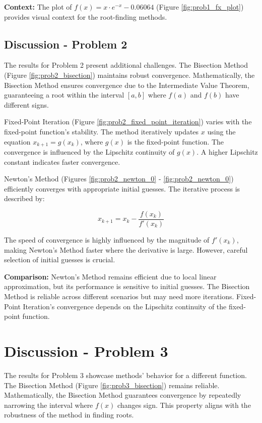 \documentclass[12pt, letterpaper]{article}
\begin{document}
\textbf{Context:} The plot of \(f(x) = x \cdot e^{-x} - 0.06064\) (Figure \ref{fig:prob1_fx_plot}) provides visual context for the root-finding methods.

\subsection*{Discussion - Problem 2}

The results for Problem 2 present additional challenges. The Bisection Method (Figure \ref{fig:prob2_bisection}) maintains robust convergence. Mathematically, the Bisection Method ensures convergence due to the Intermediate Value Theorem, guaranteeing a root within the interval \( [a, b] \) where \(f(a)\) and \(f(b)\) have different signs.

Fixed-Point Iteration (Figure \ref{fig:prob2_fixed_point_iteration}) varies with the fixed-point function's stability. The method iteratively updates \(x\) using the equation \(x_{k+1} = g(x_k)\), where \(g(x)\) is the fixed-point function. The convergence is influenced by the Lipschitz continuity of \(g(x)\). A higher Lipschitz constant indicates faster convergence.

Newton's Method (Figures \ref{fig:prob2_newton_0} - \ref{fig:prob2_newton_0}) efficiently converges with appropriate initial guesses. The iterative process is described by:

\[
x_{k+1} = x_k - \frac{f(x_k)}{f'(x_k)}
\]

The speed of convergence is highly influenced by the magnitude of \(f'(x_k)\), making Newton's Method faster where the derivative is large. However, careful selection of initial guesses is crucial.

\textbf{Comparison:} Newton's Method remains efficient due to local linear approximation, but its performance is sensitive to initial guesses. The Bisection Method is reliable across different scenarios but may need more iterations. Fixed-Point Iteration's convergence depends on the Lipschitz continuity of the fixed-point function.

\section*{Discussion - Problem 3}

The results for Problem 3 showcase methods' behavior for a different function. The Bisection Method (Figure \ref{fig:prob3_bisection}) remains reliable. Mathematically, the Bisection Method guarantees convergence by repeatedly narrowing the interval where \(f(x)\) changes sign. This property aligns with the robustness of the method in finding roots.
\end{document}
